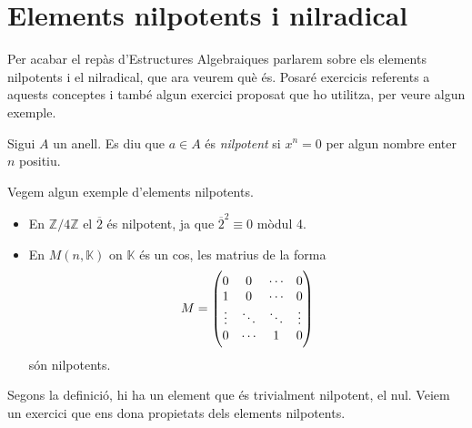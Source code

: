 \documentclass[../main.tex]{subfiles}
\begin{document}
\section{Elements nilpotents i nilradical}

Per acabar el repàs d'Estructures Algebraiques parlarem sobre els elements nilpotents i el nilradical, que ara veurem què és. Posaré exercicis referents a aquests conceptes i també algun exercici proposat que ho utilitza, per veure algun exemple.

\begin{defi}
[Nilpotent]\label{def:nilpotent} Sigui $A$ un anell. Es diu que $a\in A$ és \textit{nilpotent} si $x^n = 0$ per algun nombre enter $n$ positiu.
\end{defi}

\begin{ej}
Vegem algun exemple d'elements nilpotents. 
\begin{itemize}
    \item En $\mathbb{Z}/4\mathbb{Z}$ el $\overline{2}$ és nilpotent, ja que $\overline{2}^2\equiv 0$ mòdul 4.
    \item En  $M(n,\mathbb{K})$ on $\mathbb{K}$ és un cos, les matrius de la forma
    \begin{equation}
        \notag
        M = 
        \begin{pmatrix}
            0 & 0 & \cdots & 0  \\
            1 & 0 & \cdots & 0  \\
            \vdots & \ddots & \ddots  & \vdots \\
            0 &  \cdots & 1 & 0
        \end{pmatrix}
    \end{equation}
    són nilpotents.
\end{itemize}
\end{ej}

Segons la definició, hi ha un element que és trivialment nilpotent, el nul. Veiem un exercici que ens dona propietats dels elements nilpotents.

\setcounter{exercici}{26}
\end{document}
